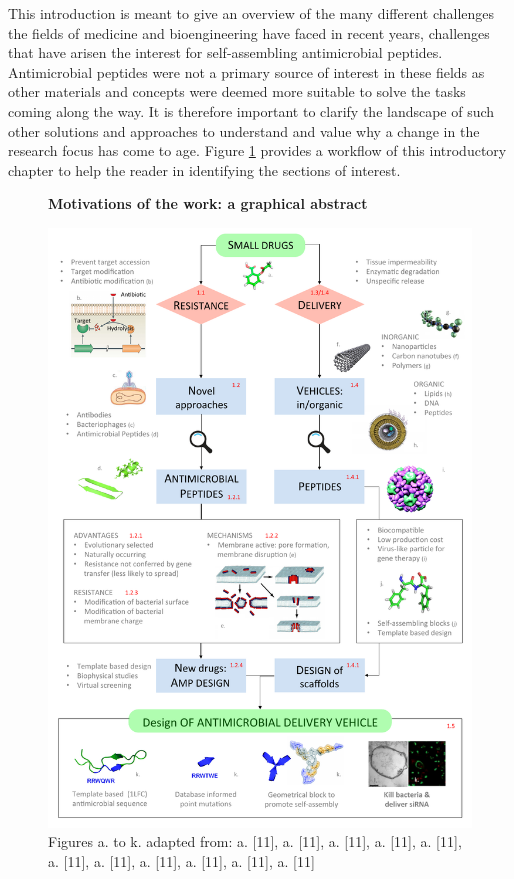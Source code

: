 \documentclass[a4paper,11pt]{extreport}
\begin{document}
\vspace{2cm}
This introduction is meant to give an overview of the many different challenges the fields of medicine and bioengineering have faced in recent years, challenges that have arisen the interest for self-assembling antimicrobial peptides. Antimicrobial peptides were not a primary source of interest in these fields as other materials and concepts were deemed more suitable to solve the tasks coming along the way. It is therefore important to clarify the landscape of such other solutions and approaches to understand and value why a change in the research focus has come to age. Figure \ref{fig:intro} provides a workflow of this introductory chapter to help the reader in identifying the sections of interest.

\begin{figure}
\centering
\Large{\textbf{Motivations of the work: a graphical abstract}}\par\bigskip
\includegraphics[width = \textwidth]{pics/scheme_intro}
\caption{Figures a. to k. adapted from: a. [11], a. [11], a. [11], a. [11], a. [11], a. [11], a. [11], a. [11], a. [11], a. [11], a. [11]} \label{fig:intro}
\end{figure}
\end{document}
